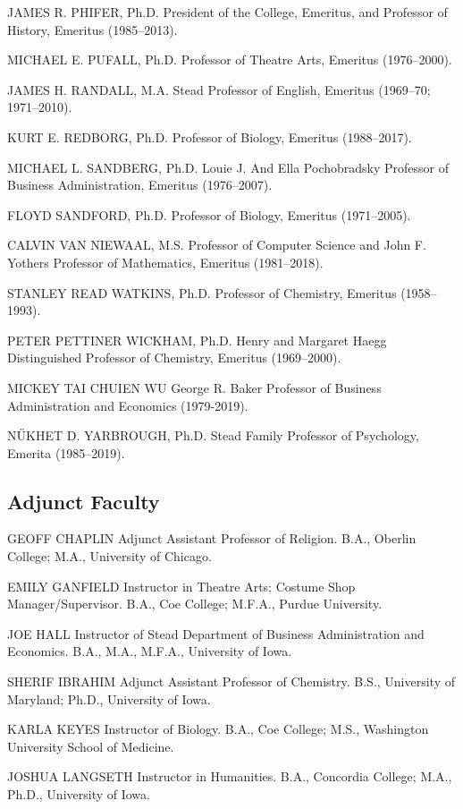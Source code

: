 \documentclass[
  letterpaper,
]{scrbook}
\begin{document}
JAMES R. PHIFER, Ph.D. President of the College, Emeritus, and Professor
of History, Emeritus (1985--2013).

MICHAEL E. PUFALL, Ph.D. Professor of Theatre Arts, Emeritus
(1976--2000).

JAMES H. RANDALL, M.A. Stead Professor of English, Emeritus (1969--70;
1971--2010).

KURT E. REDBORG, Ph.D. Professor of Biology, Emeritus (1988--2017).

MICHAEL L. SANDBERG, Ph.D. Louie J. And Ella Pochobradsky Professor of
Business Administration, Emeritus (1976--2007).

FLOYD SANDFORD, Ph.D. Professor of Biology, Emeritus (1971--2005).

CALVIN VAN NIEWAAL, M.S. Professor of Computer Science and John F.
Yothers Professor of Mathematics, Emeritus (1981--2018).

STANLEY READ WATKINS, Ph.D. Professor of Chemistry, Emeritus
(1958--1993).

PETER PETTINER WICKHAM, Ph.D. Henry and Margaret Haegg Distinguished
Professor of Chemistry, Emeritus (1969--2000).

MICKEY TAI CHUIEN WU George R. Baker Professor of Business
Administration and Economics (1979-2019).

NŰKHET D. YARBROUGH, Ph.D. Stead Family Professor of Psychology, Emerita
(1985--2019).

\hypertarget{adjunct-faculty}{%
\subsection{Adjunct Faculty}\label{adjunct-faculty}}

GEOFF CHAPLIN Adjunct Assistant Professor of Religion. B.A., Oberlin
College; M.A., University of Chicago.

EMILY GANFIELD Instructor in Theatre Arts; Costume Shop
Manager/Supervisor. B.A., Coe College; M.F.A., Purdue University.

JOE HALL Instructor of Stead Department of Business Administration and
Economics. B.A., M.A., M.F.A., University of Iowa.

SHERIF IBRAHIM Adjunct Assistant Professor of Chemistry. B.S.,
University of Maryland; Ph.D., University of Iowa.

KARLA KEYES Instructor of Biology. B.A., Coe College; M.S., Washington
University School of Medicine.

JOSHUA LANGSETH Instructor in Humanities. B.A., Concordia College; M.A.,
Ph.D., University of Iowa.
\end{document}
